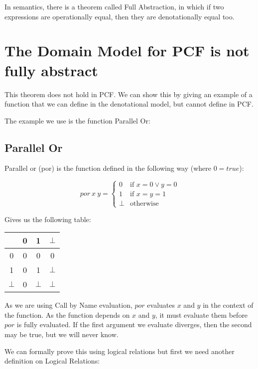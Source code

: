 In semantics, there is a theorem called Full Abstraction, in which if two expressions are operationally equal, then they are denotationally equal too.

\section{The Domain Model for PCF is not fully abstract}
This theorem does not hold in PCF. We can show this by giving an example of a function that we can define in the denotational model, but cannot define in PCF.

The example we use is the function  Parallel Or:

\subsection{Parallel Or}

Parallel or (por) is the function defined in the following way (where $0 = true$):

\[ por \ x \ y =
\left\{
	\begin{array}{ll}
		0  & \mbox{if } x = 0  \vee y = 0 \\
		1 & \mbox{if } x = y = 1 \\
		\bot & \mbox{otherwise}
	\end{array}
\right.\]

Gives us the following table:
\begin{center}
\begin{tabular}{ c | c | c | c}
    & 0 & 1 & $\bot$ \\
    \hline
   0 & 0 & 0 & 0 \\
   1 & 0 & 1 & $\bot$ \\
   $\bot$ & 0 & $\bot$ & $\bot$\\   
\end{tabular}
\end{center}

\vspace{0.5cm}

As we are using Call by Name evaluation, $por$ evaluates $x$ and $y$ in the context of the function. As the function depends on $x$ and $y$, it must evaluate them before $por$ is fully evaluated. If the first argument we evaluate diverges, then the second may be true, but we will never know.

We can formally prove this using logical relations but first we need another definition on Logical Relations:


